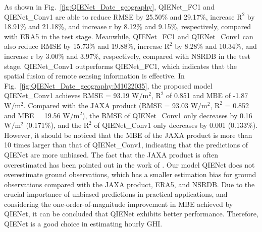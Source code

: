 \documentclass[review]{elsarticle}
\begin{document}
As shown in Fig.~\ref{fig:QIENet_Date_geography},
QIENet\_FC1 and QIENet\_Conv1 are able to reduce RMSE by 25.50\% and 29.17\%, increase $\mathrm{R^{2}}$ by 18.91\% and 21.18\%, and increase r by 8.12\% and 9.15\%, respectively, compared with ERA5 in the test stage.
Meanwhile, QIENet\_FC1 and QIENet\_Conv1 can also reduce RMSE by 15.73\% and 19.88\%, increase $\mathrm{R^{2}}$ by 8.28\% and 10.34\%, and increase r by 3.00\% and 3.97\%, respectively, compared with NSRDB in the test stage.
QIENet\_Conv1 outperforms QIENet\_FC1, which indicates that the spatial fusion of remote sensing information is effective.
In Fig.~\ref{fig:QIENet_Date_geography:M1022035}, the proposed model QIENet\_Conv1 achieves RMSE = 93.19 $\mathrm{W/m^{2}}$, $\mathrm{R^{2}}$ of 0.851 and MBE of -1.87 $\mathrm{W/m^{2}}$. Compared with the JAXA product (RMSE = 93.03 $\mathrm{W/m^{2}}$, $\mathrm{R^{2}}$ = 0.852 and MBE = 19.56 $\mathrm{W/m^{2}}$), the RMSE of QIENet\_Conv1 only decreases by 0.16 $\mathrm{W/m^{2}}$ (0.171\%), and the $\mathrm{R^{2}}$ of QIENet\_Conv1 only decreases by 0.001 (0.133\%).
However, it should be noticed that the MBE of the JAXA product is more than 10 times larger than that of QIENet\_Conv1, indicating that the predictions of QIENet are more unbiased.
The fact that the JAXA product is often overestimated has been pointed out in the work of \citet{Damiani2018}.
Our model QIENet does not overestimate ground observations, which has a smaller estimation bias for ground observations compared with the JAXA product, ERA5, and NSRDB.
Due to the crucial importance of unbiased predictions in practical applications, and considering the one-order-of-magnitude improvement in MBE achieved by QIENet, it can be concluded that QIENet exhibits better performance.
Therefore, QIENet is a good choice in estimating hourly GHI.
\end{document}
